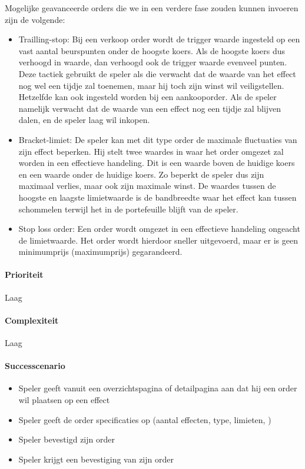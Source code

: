 Mogelijke geavanceerde orders die we in een verdere fase zouden kunnen invoeren zijn de volgende:
\begin{itemize}
	\item Trailling-stop: Bij een verkoop order wordt de trigger waarde ingesteld op een vast aantal beurspunten onder de hoogste koers. Als de hoogste koers dus verhoogd in waarde, dan verhoogd ook de trigger waarde evenveel punten. Deze tactiek gebruikt de speler als die verwacht dat de waarde van het effect nog wel een tijdje zal toenemen, maar hij toch zijn winst wil veiligstellen. Hetzelfde kan ook ingesteld worden bij een aankooporder. Als de speler namelijk verwacht dat de waarde van een effect nog een tijdje zal blijven dalen, en de speler laag wil inkopen.
  \item Bracket-limiet: De speler kan met dit type order de maximale fluctuaties van zijn effect beperken. Hij stelt twee waardes in waar het order omgezet zal worden in een effectieve handeling. Dit is een waarde boven de huidige koers en een waarde onder de huidige koers. Zo beperkt de speler dus zijn maximaal verlies, maar ook zijn maximale winst. De waardes tussen de hoogste en laagste limietwaarde is de bandbreedte waar het effect kan tussen schommelen terwijl het in de portefeuille blijft van de speler.
  \item Stop loss order: Een order wordt omgezet in een effectieve handeling ongeacht de limietwaarde. Het order wordt hierdoor sneller uitgevoerd, maar er is geen minimumprijs (maximumprijs) gegarandeerd.
\end{itemize}
\paragraph{Prioriteit}Laag
\paragraph{Complexiteit}Laag
\paragraph{Successcenario}
\begin{itemize}
 \item Speler geeft vanuit een overzichtspagina of detailpagina aan dat hij een order wil plaatsen op een effect
 \item Speler geeft de order specificaties op (aantal effecten, type, limieten, )
 \item Speler bevestigd zijn order
 \item \label{def:aankopen:bevestiging} Speler krijgt een bevestiging van zijn order
\end{itemize}
